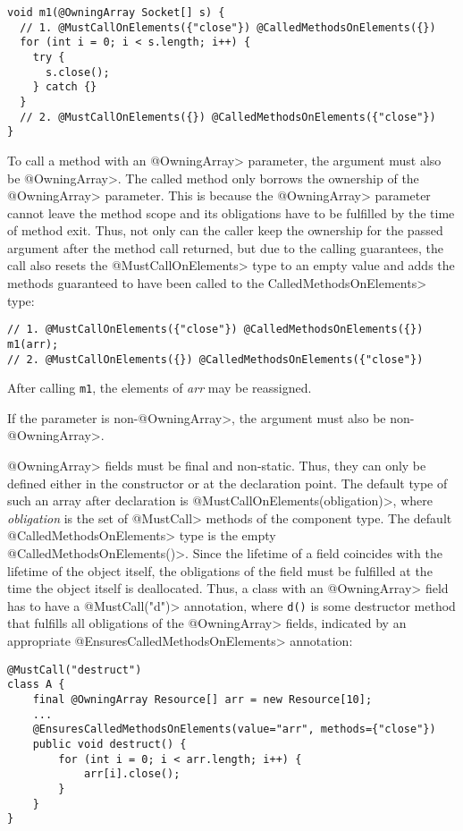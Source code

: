 \begin{verbatim}
void m1(@OwningArray Socket[] s) {
  // 1. @MustCallOnElements({"close"}) @CalledMethodsOnElements({})
  for (int i = 0; i < s.length; i++) {
    try {
      s.close();
    } catch {}
  }
  // 2. @MustCallOnElements({}) @CalledMethodsOnElements({"close"})
}
\end{verbatim}

To call a method with an \<@OwningArray> parameter, the argument must also be \<@OwningArray>. The called method only borrows the ownership of the \<@OwningArray> parameter. This is because the \<@OwningArray> parameter cannot leave the method scope and its obligations have to be fulfilled by the time of method exit. Thus, not only can the caller keep the ownership for the passed argument after the method call returned, but due to the calling guarantees, the call also resets the \<@MustCallOnElements> type to an empty value and adds the methods guaranteed to have been called to the \<CalledMethodsOnElements> type:

\begin{verbatim}
// 1. @MustCallOnElements({"close"}) @CalledMethodsOnElements({})
m1(arr);
// 2. @MustCallOnElements({}) @CalledMethodsOnElements({"close"})
\end{verbatim}

After calling \texttt{m1}, the elements of \textit{arr} may be reassigned.

If the parameter is non-\<@OwningArray>, the argument must also be non-\<@OwningArray>.

\<@OwningArray> fields must be final and non-static. Thus, they can only be defined either in the constructor or at the declaration point.
The default type of such an array after declaration is \<@MustCallOnElements(obligation)>, where \textit{obligation} is the set of \<@MustCall> methods of the component type. The default \<@CalledMethodsOnElements> type is the empty \<@CalledMethodsOnElements({})>.
Since the lifetime of a field coincides with the lifetime of the object itself, the obligations of the field must be fulfilled at the time the object itself is deallocated.
Thus, a class with an \<@OwningArray> field has to have a \<@MustCall("d")> annotation, where \texttt{d()} is some destructor method that fulfills all obligations of the \<@OwningArray> fields, indicated by an appropriate \<@EnsuresCalledMethodsOnElements> annotation:

\begin{verbatim}
@MustCall("destruct")
class A {
    final @OwningArray Resource[] arr = new Resource[10];
    ...
    @EnsuresCalledMethodsOnElements(value="arr", methods={"close"})
    public void destruct() {
        for (int i = 0; i < arr.length; i++) {
            arr[i].close();
        }
    }
}
\end{verbatim}

